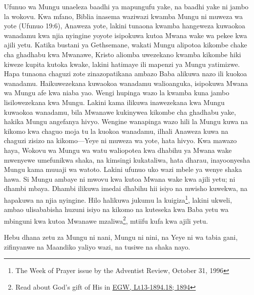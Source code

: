 Ufunuo wa Mungu unaeleza baadhi ya mapungufu yake, na baadhi yake ni jambo la wokovu. Kwa mfano, Biblia inasema waziwazi kwamba Mungu ni muweza wa yote (Ufunuo 19:6), Anaweza yote, lakini tunaona kwamba hangeweza kuwaokoa wanadamu kwa njia nyingine yoyote isipokuwa kutoa Mwana wake wa pekee kwa ajili yetu. Katika bustani ya Gethsemane, wakati Mungu alipotoa kikombe chake cha ghadhabu kwa Mwanawe, Kristo aliomba uwezekano kwamba kikombe hiki kiweze kupita kutoka kwake, lakini hatimaye ili mapenzi ya Mungu yatimizwe. Hapa tunaona chaguzi zote zinazopatikana ambazo Baba alikuwa nazo ili kuokoa wanadamu. Haikuwezekana kuwaokoa wanadamu walioanguka, isipokuwa Mwana wa Mungu afe kwa niaba yao. Wengi hupinga wazo la kwamba kuna jambo lisilowezekana kwa Mungu. Lakini kama ilikuwa inawezekana kwa Mungu kuwaokoa wanadamu, bila Mwanawe kukinywea kikombe cha ghadhabu yake, hakika Mungu angefanya hivyo. Wengine wanapinga wazo hili la Mungu kuwa na kikomo kwa chaguo moja tu la kuokoa wanadamu, ilhali Anaweza kuwa na chaguzi zisizo na kikomo—Yeye ni muweza wa yote, hata hivyo. Kwa mawazo haya, Wokovu wa Mungu wa watu waliopotea kwa dhabihu ya Mwana wake mwenyewe umefunikwa shaka, na kimsingi kukataliwa, hata dharau, inayoonyesha Mungu kama muuaji wa watoto. Lakini ufunuo uko wazi mbele ya wenye shaka hawa. Si Mungu ambaye ni mwovu kwa kutoa Mwana wake kwa ajili yetu; ni dhambi mbaya. Dhambi ilikuwa imedai dhabihu hii isiyo na mwisho kuwekwa, na hapakuwa na njia nyingine. Hilo halikuwa jukumu la kuigiza\footnote{The Week of Prayer issue by the Adventist Review, October 31, 1996}, lakini ukweli, ambao ulisababisha huzuni isiyo na kikomo na kuteseka kwa Baba yetu wa mbinguni kwa kutoa Mwanawe mzaliwa\footnote{Read about God's gift of His  in \href{https://egwwritings.org/?ref=en_Lt13-1894.18&para=5486.24}{{EGW, Lt13-1894.18; 1894}}}, mtiifu kufa kwa ajili yetu.


Hebu dhana zetu za Mungu ni nani, Mungu ni nini, na Yeye ni wa tabia gani, zifinyanwe na Maandiko yaliyo wazi, na tusiwe na shaka nayo.





